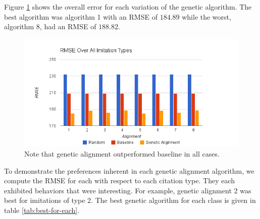 \label{results}


Figure \ref{fig:overall} shows the overall error for each variation of the genetic algorithm. The best algorithm was algorithm 1 with an RMSE of $184.89$ while the worst, algorithm 8, had an RMSE of $188.82$. %

\begin{figure}[center]
	\centering
	\includegraphics[width=16cm]{images/chart9.png}
	\caption{Note that genetic alignment outperformed baseline in all cases.}
	\label{fig:overall}
\end{figure}

To demonstrate the preferences inherent in each genetic alignment algorithm, we compute the RMSE for each with respect to each citation type. They each exhibited behaviors that were interesting. For example, genetic alignment 2 was best for imitations of type 2. The best genetic algorithm for each class is given in table \ref{tab:best-for-each}.

